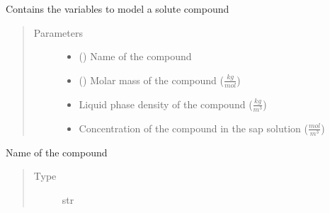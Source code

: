 \documentclass[letterpaper,10pt,english]{sphinxmanual}
\begin{document}

\begin{fulllineitems}
\label{\detokenize{index:src.solute.Solute}}
Contains the variables to model a solute compound
\begin{quote}\begin{description}
\item[{Parameters}] \leavevmode\begin{itemize}
\item {} 
 () \textendash{} Name of the compound

\item {} 
 () \textendash{} Molar mass of the compound (\(\frac{kg}{mol}\))

\item {} 
 \textendash{} Liquid phase density of the compound (\(\frac{kg}{m^3}\))

\item {} 
 \textendash{} Concentration of the compound in the sap solution (\(\frac{mol}{m^3}\))

\end{itemize}

\end{description}\end{quote}

\begin{fulllineitems}
\label{\detokenize{index:src.solute.Solute.name}}
Name of the compound
\begin{quote}\begin{description}
\item[{Type}] \leavevmode
str


\end{description}
\end{quote}
\end{fulllineitems}
\end{fulllineitems}
\end{document}
